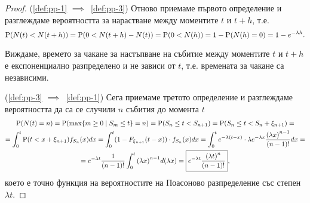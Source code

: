 \documentclass[numbers=endperiod, DIV=15, bibliography=totocnumbered]{scrartcl}
\begin{document}
\begin{proof}
  (\ref{def:pp-1} $\implies$~\ref{def:pp-3}) Отново приемаме първото определение и разглеждаме вероятността за нарастване между моментите $t$ и $t+h$, т.е.
  \begin{displaymath}
    \operatorname{P}(N(t) < N(t+h))
    =
    \operatorname{P}(0 < N(t+h) - N(t))
    =
    \operatorname{P}(0 < N(h))
    =
    1 - \operatorname{P}(N(h) = 0)
    =
    1 - e^{-\lambda h}.
  \end{displaymath}

  Виждаме, времето за чакане за настъпване на събитие между моментите $t$ и $t+h$ е експоненциално разпределено и не зависи от $t$, т.е. времената за чакане са независими.

  (\ref{def:pp-3} $\implies$~\ref{def:pp-1}) Сега приемаме третото определение и разглеждаме вероятността да са се случили $n$ събития до момента $t$
  \begin{multline*}
    \operatorname{P}(N(t) = n)
    =
    \operatorname{P}(\max \{ m \geq 0 \mid S_m \leq t \} = n)
    =
    \operatorname{P}(S_n \leq t < S_{n+1})
    =
    \operatorname{P}(S_n \leq t < S_n + \xi_{n+1})
    = \\ =
    \int_0^t \operatorname{P}(t < x + \xi_{n+1}) f_{S_n} (x) dx
    =
    \int_0^t (1 - F_{\xi_{n+1}} (t - x)) \cdot f_{S_n} (x) dx
    =
    \int_0^t e^{-\lambda (t-x)} \cdot \lambda e^{-\lambda x} \frac {{(\lambda x)}^{n-1}} {(n-1)!} dx
    = \\ =
    e^{-\lambda t} \frac 1 {(n-1)!} \int_0^t {(\lambda x)}^{n-1} d(\lambda x)
    =
    \boxed{e^{-\lambda t} \frac {{(\lambda t)}^n} {(n-1)!}},
  \end{multline*}
  което е точно функция на вероятностите на Поасоново разпределение със степен $\lambda t$.
\end{proof}

\printbibliography
\end{document}
